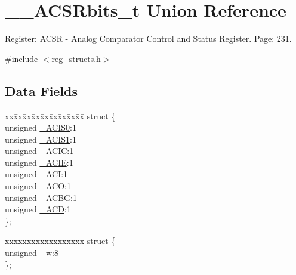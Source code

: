 \hypertarget{union_____a_c_s_rbits__t}{\section{\+\_\+\+\_\+\+A\+C\+S\+Rbits\+\_\+t Union Reference}
\label{union_____a_c_s_rbits__t}
}


Register\+: A\+C\+S\+R -\/ Analog Comparator Control and Status Register. Page\+: 231.  




{\ttfamily \#include $<$reg\+\_\+structs.\+h$>$}

\subsection*{Data Fields}
\begin{DoxyCompactItemize}
\item 
\begin{tabbing}
xx\=xx\=xx\=xx\=xx\=xx\=xx\=xx\=xx\=\kill
struct \{\\
\>unsigned \hyperlink{union_____a_c_s_rbits__t_ab8072dd91091e88a6d445d9b97d56f74}{\_ACIS0}:1\\
\>unsigned \hyperlink{union_____a_c_s_rbits__t_aabfa7134749f9369d9d8e7b0e5e91d43}{\_ACIS1}:1\\
\>unsigned \hyperlink{union_____a_c_s_rbits__t_a6fd9335a2f3d60b829b237a66b2bcb31}{\_ACIC}:1\\
\>unsigned \hyperlink{union_____a_c_s_rbits__t_a0bb335f3c419679a3a5ab48413409780}{\_ACIE}:1\\
\>unsigned \hyperlink{union_____a_c_s_rbits__t_af31654da9a49ad8389976faf3d4e6cce}{\_ACI}:1\\
\>unsigned \hyperlink{union_____a_c_s_rbits__t_aebe03bd8fb652cdae9ce0a55e5fc10ff}{\_ACO}:1\\
\>unsigned \hyperlink{union_____a_c_s_rbits__t_a9fb6b4807e7022e7836a589c6e40d0fc}{\_ACBG}:1\\
\>unsigned \hyperlink{union_____a_c_s_rbits__t_acec62737754d657371db94b593e14751}{\_ACD}:1\\
\}; \\

\end{tabbing}\item 
\begin{tabbing}
xx\=xx\=xx\=xx\=xx\=xx\=xx\=xx\=xx\=\kill
struct \{\\
\>unsigned \hyperlink{union_____a_c_s_rbits__t_a237f879730e09120645ed5574796d1b7}{\_w}:8\\
\}; \\

\end{tabbing}\end{DoxyCompactItemize}


